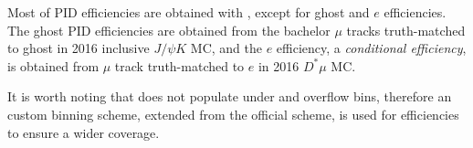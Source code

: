 Most of PID efficiencies are obtained with \pidcalib, except for ghost and
$e$ \UBDT efficiencies. The ghost PID efficiencies are obtained from the bachelor
$\mu$ tracks truth-matched to ghost in
2016 inclusive $J/\psi K$ MC, %
and the $e$ \UBDT efficiency, a \emph{conditional efficiency}, is obtained from
$\mu$ track truth-matched to $e$ in 2016 $D^*\mu$ MC.

It is worth noting that \pidcalib does not populate under and overflow bins,
therefore an custom binning scheme, extended from the official scheme, is used
for \pidcalib efficiencies to ensure a wider coverage.

